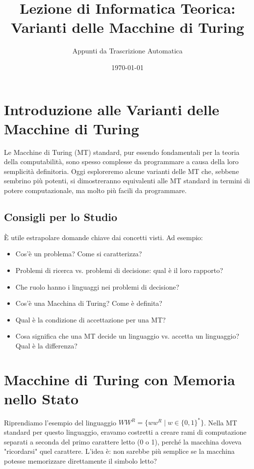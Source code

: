 \documentclass[a4paper]{article}
\title{Lezione di Informatica Teorica: Varianti delle Macchine di Turing}
\author{Appunti da Trascrizione Automatica}
\date{\today}
\begin{document}
\maketitle
\tableofcontents
\newpage

\section{Introduzione alle Varianti delle Macchine di Turing}
Le Macchine di Turing (MT) standard, pur essendo fondamentali per la teoria della computabilità, sono spesso complesse da programmare a causa della loro semplicità definitoria. Oggi esploreremo alcune varianti delle MT che, sebbene sembrino più potenti, si dimostreranno equivalenti alle MT standard in termini di potere computazionale, ma molto più facili da programmare.

\subsection{Consigli per lo Studio}
È utile estrapolare domande chiave dai concetti visti. Ad esempio:
\begin{itemize}
    \item Cos'è un problema? Come si caratterizza?
    \item Problemi di ricerca vs. problemi di decisione: qual è il loro rapporto?
    \item Che ruolo hanno i linguaggi nei problemi di decisione?
    \item Cos'è una Macchina di Turing? Come è definita?
    \item Qual è la condizione di accettazione per una MT?
    \item Cosa significa che una MT decide un linguaggio vs. accetta un linguaggio? Qual è la differenza?
\end{itemize}

\section{Macchine di Turing con Memoria nello Stato}
Riprendiamo l'esempio del linguaggio $WW^R = \{w w^R \mid w \in \{0,1\}^*\}$. Nella MT standard per questo linguaggio, eravamo costretti a creare rami di computazione separati a seconda del primo carattere letto (0 o 1), perché la macchina doveva "ricordarsi" quel carattere. L'idea è: non sarebbe più semplice se la macchina potesse memorizzare direttamente il simbolo letto?
\end{document}

